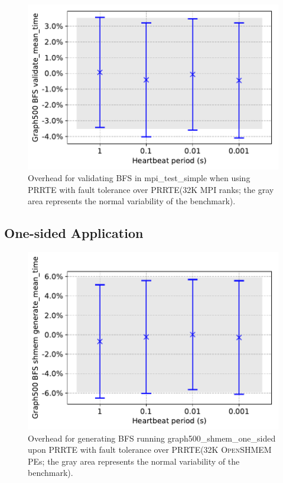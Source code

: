 \documentclass[5p,times,twocolumn]{elsarticle}
\newcommand{\prrte}[0]{\textsc{PRRTE}\xspace}
\newcommand{\mpi}[0]{\textsc{MPI}\xspace}
\newcommand{\oshmem}[0]{\textsc{OpenSHMEM}\xspace}
\begin{document}
\begin{figure}[h]
  \centering
  \includegraphics[width=\linewidth]{validate_bfs.pdf}
  \caption{Overhead for validating BFS in mpi\_test\_simple when using \prrte with fault tolerance over \prrte (32K \mpi ranks; the gray area represents the normal variability of the benchmark).}
  \label{fig:validate.bfs}
\end{figure}


\subsection{One-sided Application}

\begin{figure}[h]
  \centering
  \includegraphics[width=\linewidth]{shmem_bfs_mean.pdf}
  \caption{Overhead for generating BFS running graph500\_shmem\_one\_sided upon \prrte with fault tolerance over \prrte (32K \oshmem PEs; the gray area represents the normal variability of the benchmark).}
  \label{fig:shmem.mean.bfs}
\end{figure}
\end{document}
